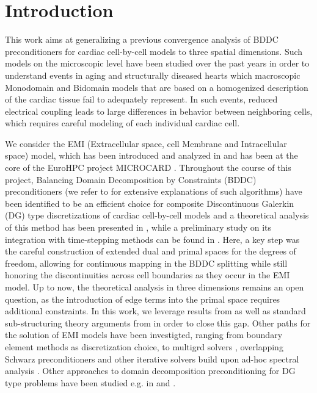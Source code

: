 \section{Introduction}

This work aims at generalizing a previous convergence analysis of BDDC preconditioners for cardiac cell-by-cell models \cite{2D-proof} to three spatial dimensions. Such models on the microscopic level have been studied over the past years in order to understand events in aging and structurally diseased hearts which macroscopic Monodomain and Bidomain models \cite{potse2006comparison, bidomain-1, bidomain-2} that are based on a homogenized description of the cardiac tissue fail to adequately represent. In such events, reduced electrical coupling leads to large differences in behavior between neighboring cells, which requires careful modeling of each individual cardiac cell.

We consider the EMI (Extracellular space, cell Membrane and Intracellular space) model, which has been introduced and analyzed in \cite{potse2017cinc, EMI-3, EMI-2, EMI-1, EMI-4, EMI-5} and has been at the core of the EuroHPC project MICROCARD \cite{microcard}. Throughout the course of this project, Balancing Domain Decomposition by Constraints (BDDC) preconditioners (we refer to \cite{pechstein2017bddc, dd-book} for extensive explanations of such algorithms) have been identified to be an efficient choice for composite Discontinuous Galerkin (DG) type discretizations of cardiac cell-by-cell models and a theoretical analysis of this method has been presented in \cite{2D-proof}, while a preliminary study on its integration with time-stepping methods can be found in \cite{chegini2023coupled}. Here, a key step was the careful construction of extended dual and primal spaces for the degrees of freedom, allowing for continuous mapping in the BDDC splitting while still honoring the discontinuities across cell boundaries as they occur in the EMI model. Up to now, the theoretical analysis in three dimensions remains an open question, as the introduction of edge terms into the primal space requires additional constraints. In this work, we leverage results from \cite{sarkis-3D} as well as standard sub-structuring theory arguments from \cite{dd-book} in order to close this gap. Other paths for the solution of EMI models have been investigted, ranging from boundary element methods \cite{bem2024} as discretization choice, to multigrd solvers \cite{budivsa2024algebraic}, overlapping Schwarz preconditioners \cite{huynh2025gdsw} and other iterative solvers build upon ad-hoc spectral analysis \cite{benedusi2024modeling}. Other approaches to domain decomposition preconditioning for DG type problems have been studied e.g. in \cite{antonietti2007esaim} and \cite{ayuso2014multilevel}.

